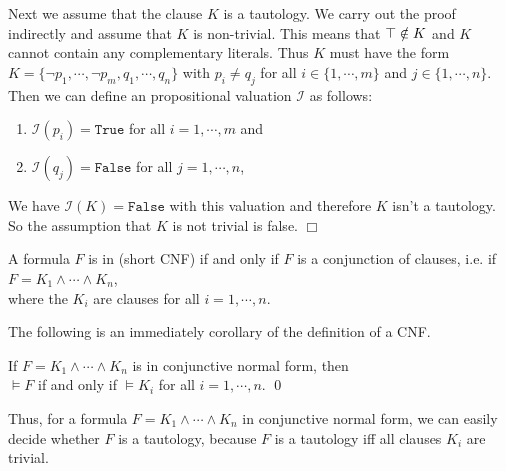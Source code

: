 Next we assume that the clause $K$ is a tautology.  We carry out the proof
indirectly and assume that $K$ is non-trivial.  This means that $\top \notin K$ and
$K$ cannot contain any complementary literals.  Thus $K$ must have the form
\\[0.2cm]
\hspace*{1.3cm} 
$K = \{ \neg p_1, \cdots, \neg p_m, q_1, \cdots, q_n \}$ \quad with $p_i
\not= q_j$ for all $i \in \{ 1,\cdots,m\}$ and $j \in \{1, \cdots, n\}$.
\\[0.2cm]
Then we can define an propositional valuation $\mathcal{I}$ as follows:
\begin{enumerate}
\item $\mathcal{I}(p_i) = \texttt{True}$ for all $i = 1, \cdots, m$ and
\item $\mathcal{I}(q_j) = \texttt{False}$ for all $j = 1, \cdots, n$,
\end{enumerate}
We have $\mathcal{I}(K) = \texttt{False}$ with this valuation and therefore $K$ isn't a tautology.  So the
assumption that $K$ is not trivial is false. 
\hspace*{\fill}  $\Box$

\begin{Definition}  
  A formula $F$ is in  (short CNF)
  if and only if $F$ is a conjunction of clauses, i.e. if \\[0.2cm]
  \hspace*{1.3cm} $F = K_1 \wedge \cdots \wedge K_n$, \\[0.2cm]
  where the $K_i$ are clauses for all $i=1,\cdots,n$. \eox
\end{Definition}

\noindent
The following is an immediately corollary of the definition of a CNF.
\begin{Corollary} \label{corollary:knf}
  If $F = K_1 \wedge \cdots \wedge K_n$ is in conjunctive normal form, then\\[0.2cm]
  \hspace*{1.3cm} $\models F$ \quad if and only if \quad $\models K_i$ \quad for all $i=1,\cdots,n$. \qed
\end{Corollary}

Thus, for a formula $F = K_1 \wedge \cdots \wedge K_n$ in conjunctive normal form, we can easily decide whether
$F$ is a tautology, because $F$ is a tautology iff all clauses $K_i$ are trivial.
\vspace*{0.2cm}

